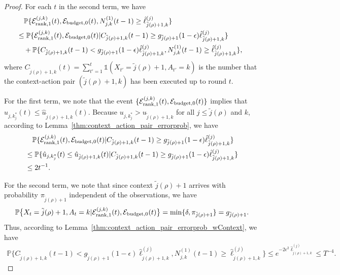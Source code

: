 \begin{proof}
For each $t$ in the second term, we have
\begin{align}
&\quad\mathbb{P}\{\mathcal{E}^{(j,k)}_{{\rm rank}, 1}(t), \mathcal{E}_{\rm budget, 0}(t),N^{(1)}_{j,k}(t-1) \geq  \hat{\ell}^{(j)}_{\tilde{j}(\rho)+1,k}\} \nonumber \\
&\leq  \mathbb{P}\{\mathcal{E}^{(j,k)}_{{\rm rank}, 1}(t), \mathcal{E}_{\rm budget, 0}(t) |C_{\tilde{j}(\rho)+1,k}(t-1) \geq g_{\tilde{j}(\rho)+1}(1-\epsilon)\hat{\ell}^{(j)}_{\tilde{j}(\rho)+1,k}\} \nonumber \\
& \quad + \mathbb{P}\{C_{\tilde{j}(\rho)+1,k}(t-1) < g_{\tilde{j}(\rho)+1}(1-\epsilon)\hat{\ell}^{(j)}_{\tilde{j}(\rho)+1,k},  N^{(1)}_{j,k}(t-1) \geq  \hat{\ell}^{(j)}_{\tilde{j}(\rho)+1,k}\},~~\nonumber
\end{align}
where $C_{\tilde{j}(\rho)+1,k}(t) = \sum_{t'=1}^t \mathds{1}(X_{t'} = \tilde{j}(\rho)+1,A_{t'} = k)$ is the number that the context-action pair $(\tilde{j}(\rho)+1,k)$ has been executed up to round $t$.

For the first term, we note that the event $\{\mathcal{E}^{(j,k)}_{{\rm rank}, 1}(t), \mathcal{E}_{\rm budget, 0}(t)\}$ implies that $\hat{u}_{j, k_{j}^*}(t) \leq \hat{u}_{\tilde{j}(\rho)+1,k}(t)$. Because ${u}_{j, k_{j}^*} > {u}_{\tilde{j}(\rho)+1,k}$ for all $j \leq \tilde{j}(\rho)$ and $k$, according to Lemma~\ref{thm:context_action_pair_errorprob}, we have
\begin{align}\label{eq:error1_bound_ucb_rank}
& \quad \mathbb{P}\{\mathcal{E}^{(j,k)}_{{\rm rank}, 1}(t), \mathcal{E}_{\rm budget, 0}(t)|C_{\tilde{j}(\rho)+1,k}(t-1) \geq g_{\tilde{j}(\rho)+1}(1-\epsilon)\hat{\ell}^{(j)}_{\tilde{j}(\rho)+1,k}\} \nonumber \\
&\leq \mathbb{P}\{\hat{u}_{j, k_{j}^*}(t) \leq \hat{u}_{\tilde{j}(\rho)+1,k}(t) |C_{\tilde{j}(\rho)+1,k}(t-1) \geq g_{\tilde{j}(\rho)+1}(1-\epsilon)\hat{\ell}^{(j)}_{\tilde{j}(\rho)+1,k}\} \nonumber \\
&\leq 2t^{-1}.
\end{align}

For the second term, we note that since context $\tilde{j}(\rho)+1$ arrives with probability $\pi_{\tilde{j}(\rho)+1}$ independent of the observations, we have
\begin{align}
\mathbb{P}\big\{X_{t} = \tilde{j}(\rho)+1, A_{t} = k | \mathcal{E}^{(j,k)}_{{\rm rank}, 1}(t), \mathcal{E}_{\rm budget, 0}(t)\big\}
 = \min\{\delta, \pi_{\tilde{j}(\rho)+1}\} = g_{\tilde{j}(\rho)+1}. \nonumber
\end{align}
Thus, according to Lemma~\ref{thm:context_action_pair_errorprob_wContext}, we have
\begin{align}\label{eq:error1_bound_pulls}
\mathbb{P}\{C_{\tilde{j}(\rho)+1,k}(t-1) < g_{\tilde{j}(\rho)+1}(1-\epsilon)\hat{\ell}^{(j)}_{\tilde{j}(\rho)+1,k},  N^{(1)}_{j,k}(t-1) \geq  \hat{\ell}^{(j)}_{\tilde{j}(\rho)+1,k}\}  \leq e^{-2\epsilon^2 \hat{\ell}^{(j)}_{\tilde{j}(\rho)+1,k}} \leq T^{-4}.
\end{align}


\end{proof}
